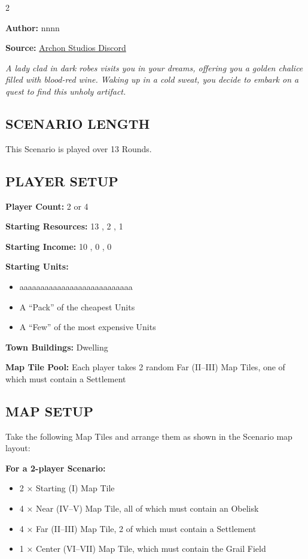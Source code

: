 
\begin{multicols*}{2}

\textbf{Author:} nnnn

\textbf{Source:} \href{https://discord.com/channels/740870068178649108/1239631918643941509}{Archon Studios Discord}

\textit{A lady clad in dark robes visits you in your dreams, offering you a golden chalice filled with blood-red wine. Waking up in a cold sweat, you decide to embark on a quest to find this unholy artifact.}

\subsection*{\MakeUppercase{Scenario Length}}
This Scenario is played over 13 Rounds.

\subsection*{\MakeUppercase{Player Setup}}
\textbf{Player Count:} 2 or 4

\textbf{Starting Resources:} 13 , 2 , 1 

\textbf{Starting Income:} 10 , 0 , 0 

\textbf{Starting Units:}
\begin{itemize}
	\item aaaaaaaaaaaaaaaaaaaaaaaaaaa
  \item A ``Pack'' of the cheapest  Units
  \item A ``Few'' of the most expensive  Units
\end{itemize}

\textbf{Town Buildings:}  Dwelling

\textbf{Map Tile Pool:} Each player takes 2 random Far (II--III) Map Tiles, one of which must contain a Settlement

\subsection*{\MakeUppercase{Map Setup}}
Take the following Map Tiles and arrange them as shown in the Scenario map layout:

\textbf{For a 2-player Scenario:}
\begin{itemize}
  \item 2 × Starting (I) Map Tile
  \item 4 × Near (IV--V) Map Tile, all of which must contain an Obelisk
  \item 4 × Far (II--III) Map Tile, 2 of which must contain a Settlement
  \item 1 × Center (VI--VII) Map Tile, which must contain the Grail Field
\end{itemize}


\end{multicols*}
